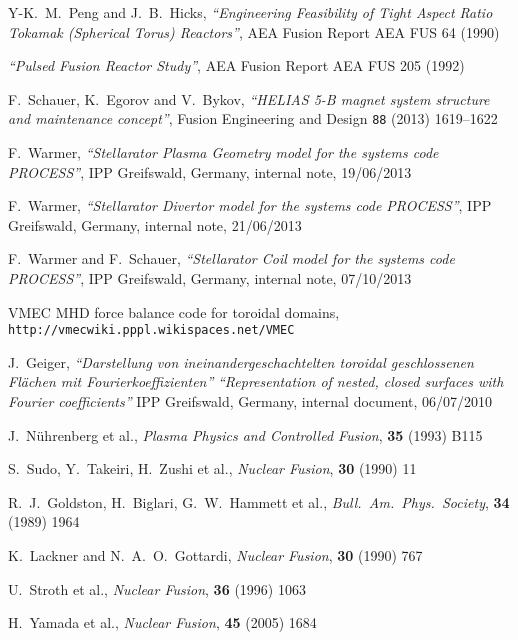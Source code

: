 \documentclass[11pt,a4paper]{report}
\begin{document}
\begin{thebibliography}{99}
Y-K.\ M.\ Peng and J.\ B.\ Hicks,
\textit{``Engineering Feasibility of Tight Aspect Ratio Tokamak
(Spherical Torus) Reactors''},
AEA Fusion Report AEA FUS 64 (1990)

\textit{``Pulsed Fusion Reactor Study''},
AEA Fusion Report AEA FUS 205
(1992)

F.\ Schauer, K.\ Egorov and V.\ Bykov,
\textit{``HELIAS 5-B magnet system structure and maintenance concept''},
Fusion Engineering and Design \texttt{88} (2013) 1619--1622

F.\ Warmer,
\textit{``Stellarator Plasma Geometry model for the systems code PROCESS''},
IPP Greifswald, Germany, internal note, 19/06/2013

F.\ Warmer,
\textit{``Stellarator Divertor model for the systems code PROCESS''},
IPP Greifswald, Germany, internal note, 21/06/2013

F.\ Warmer and F.\ Schauer,
\textit{``Stellarator Coil model for the systems code PROCESS''},
IPP Greifswald, Germany, internal note, 07/10/2013

VMEC MHD force balance code for toroidal domains,
\texttt{http://vmecwiki.pppl.wikispaces.net/VMEC}

J.\ Geiger,
\textit{``Darstellung von ineinandergeschachtelten toroidal geschlossenen
  Fl\"{a}chen mit Fourierkoeffizienten''} \textit{``Representation of
  nested, closed surfaces with Fourier coefficients''}
IPP Greifswald, Germany, internal document, 06/07/2010

J.\ N\"{u}hrenberg et al., \textit{Plasma Physics and Controlled Fusion},
\textbf{35} (1993) B115

S.\ Sudo, Y.\ Takeiri, H.\ Zushi et al., \textit{Nuclear Fusion}, \textbf{30} (1990)
11

R.\ J.\ Goldston, H.\ Biglari, G.\ W.\ Hammett et al.,
\textit{Bull.\ Am.\ Phys.\ Society}, \textbf{34} (1989) 1964

K.\ Lackner and N.\ A.\ O.\ Gottardi,
\textit{Nuclear Fusion}, \textbf{30} (1990) 767

U.\ Stroth et al.,
\textit{Nuclear Fusion}, \textbf{36} (1996) 1063

H.\ Yamada et al.,
\textit{Nuclear Fusion}, \textbf{45} (2005) 1684


\end{thebibliography}
\end{document}
